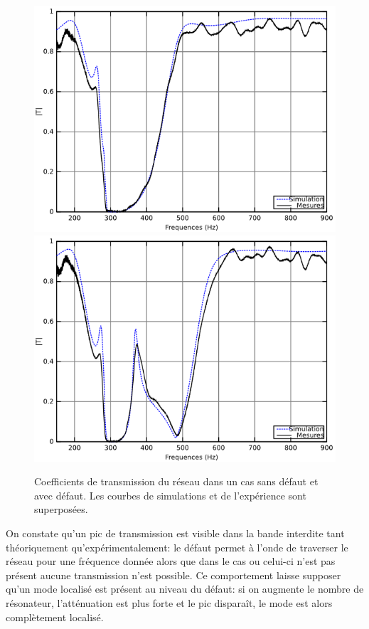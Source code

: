 \begin{figure}[!h]
\centering
\includegraphics[scale=0.4]{images_chp3/5HR165_nodefect.png}\hfill
\includegraphics[scale=0.4]{images_chp3/5HR165_8cm_pos3.png}
\caption{\label{ref_trans1} Coefficients de transmission du réseau dans un cas sans défaut et avec défaut. Les courbes de simulations et de l’expérience sont superposées.}
\end{figure}

On constate qu'un pic de transmission est visible dans la bande interdite tant théoriquement qu'expérimentalement: le défaut permet à l'onde de traverser le réseau pour une fréquence donnée alors que dans le cas ou celui-ci n'est pas présent aucune transmission n'est possible. Ce comportement laisse supposer qu'un mode localisé est présent au niveau du défaut: si on augmente le nombre de résonateur, l'atténuation est plus forte et le pic disparaît, le mode est alors complètement localisé.

